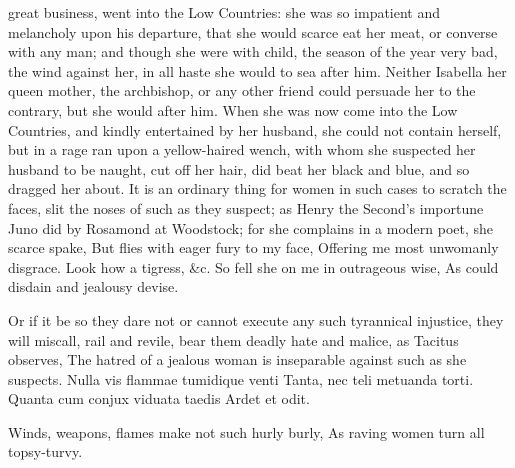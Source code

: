 {great business, went into the Low Countries: she was so impatient and
melancholy upon his departure, that she would scarce eat her meat, or
converse with any man; and though she were with child, the season of
the year very bad, the wind against her, in all haste she would to sea
after him. Neither Isabella her queen mother, the archbishop, or any
other friend could persuade her to the contrary, but she would after
him. When she was now come into the Low Countries, and kindly
entertained by her husband, she could not contain herself, but in
a rage ran upon a yellow-haired wench, with whom she suspected her
husband to be naught, cut off her hair, did beat her black and blue,
and so dragged her about. It is an ordinary thing for women in such
cases to scratch the faces, slit the noses of such as they suspect; as
Henry the Second's importune Juno did by Rosamond at Woodstock; for she
complains in a modern poet, she scarce spake,
But flies with eager fury to my face,
Offering me most unwomanly disgrace.
Look how a tigress, \&c.
So fell she on me in outrageous wise,
As could disdain and jealousy devise.

Or if it be so they dare not or cannot execute any such tyrannical
injustice, they will miscall, rail and revile, bear them deadly hate
and malice, as Tacitus observes, The hatred of a jealous woman is
inseparable against such as she suspects.
Nulla vis flammae tumidique venti
Tanta, nec teli metuanda torti.
Quanta cum conjux viduata taedis
Ardet et odit.

Winds, weapons, flames make not such hurly burly,
As raving women turn all topsy-turvy.

}
